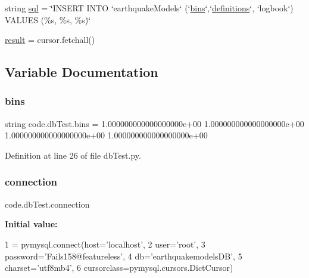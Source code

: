 \begin{DoxyCompactItemize}
\item 
string \hyperlink{namespacecode_1_1db_test_ae2262b4a4c2e113982780653f6b0767c}{sql} = \char`\"{}I\+N\+S\+E\+RT I\+N\+TO `earthquake\+Models` (`\hyperlink{namespacecode_1_1db_test_a561bd0a04a7558dbcf60255372f36535}{bins}`,`\hyperlink{namespacecode_1_1db_test_a18a56fcf49697eac62112214eac2cfc9}{definitions}`, `logbook`) V\+A\+L\+U\+ES (\%s, \%s, \%s)\char`\"{}
\item 
\hyperlink{namespacecode_1_1db_test_a1a684511f172ae02c84e5025bf6c96f5}{result} = cursor.\+fetchall()
\end{DoxyCompactItemize}


\subsection{Variable Documentation}
\mbox{\label{namespacecode_1_1db_test_a561bd0a04a7558dbcf60255372f36535}} 
\subsubsection{\texorpdfstring{bins}{bins}}
{\footnotesize\ttfamily string code.\+db\+Test.\+bins = \textquotesingle{}1.\+000000000000000000e+00 1.\+000000000000000000e+00 1.\+000000000000000000e+00 1.\+000000000000000000e+00\textquotesingle{}}



Definition at line 26 of file db\+Test.\+py.

\mbox{\label{namespacecode_1_1db_test_adb7cfea0c26c75be85f5b69f5f614495}} 
\subsubsection{\texorpdfstring{connection}{connection}}
{\footnotesize\ttfamily code.\+db\+Test.\+connection}

{\bfseries Initial value\+:}
\begin{DoxyCode}
1 =  pymysql.connect(host=\textcolor{stringliteral}{'localhost'},
2                              user=\textcolor{stringliteral}{'root'},
3                              password=\textcolor{stringliteral}{'Fails158@featureless'},
4                              db=\textcolor{stringliteral}{'earthquakemodelsDB'},
5                              charset=\textcolor{stringliteral}{'utf8mb4'},
6                              cursorclass=pymysql.cursors.DictCursor)
\end{DoxyCode}


